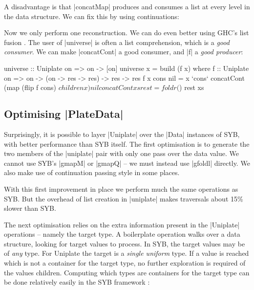 A disadvantage is that |concatMap| produces and consumes a list at every level in the data structure. We can fix this by using continuations:


Now we only perform one reconstruction. We can do even better using GHC's list fusion \cite{spj:rules}. The user of |universe| is often a list comprehension, which is a \textit{good consumer}. We can make |concatCont| a good consumer, and |f| a \textit{good producer}:

\begin{code}
universe :: Uniplate on => on -> [on]
universe x = build (f x)
    where
    f :: Uniplate on => on -> (on -> res -> res) -> res -> res
    f x cons nil = x `cons`
        concatCont (map (flip f cons) $ children x) nil

concatCont xs rest = foldr ($) rest xs
\end{code}

\subsection{Optimising |PlateData|}
\label{secU:optimise_playdata}

Surprisingly, it is possible to layer |Uniplate| over the |Data| instances of SYB, with better performance than SYB itself. The first optimisation is to generate the two members of the |uniplate| pair with only one pass over the data value. We cannot use SYB's |gmapM| or |gmapQ| -- we must instead use |gfoldl| directly. We also make use of continuation passing style in some places.

With this first improvement in place we perform much the same operations as SYB. But the overhead of list creation in |uniplate| makes traversals about 15\% slower than SYB.

The next optimisation relies on the extra information present in the |Uniplate| operations -- namely the target type. A boilerplate operation walks over a data structure, looking for target values to process. In SYB, the target values may be of \textit{any} type. For Uniplate the target is a \textit{single uniform} type. If a value is reached which is not a container for the target type, no further exploration is required of the values children. Computing which types are containers for the target type can be done relatively easily in the SYB framework \citep{lammel:syb2}:

